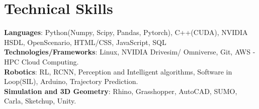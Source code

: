 \documentclass[letterpaper,11pt]{article}
\newcommand{\resumeSubHeadingListStart}{\begin{itemize}[leftmargin=0.0in, label={}]}
\newcommand{\resumeSubHeadingListEnd}{\end{itemize}}
\begin{document}


\section{Technical Skills}
 \begin{itemize}[leftmargin=0.15in, label={}]
    \small{\item{
     \textbf{Languages}{: Python(Numpy, Scipy, Pandas, Pytorch), C++(CUDA), NVIDIA HSDL, OpenScenario, HTML/CSS, JavaScript, SQL} \\
     \textbf{Technologies/Frameworks}{: Linux, NVIDIA Drivesim/ Omniverse, Git, AWS - HPC Cloud Computing.} \\
     \textbf{Robotics}{: RL, RCNN, Perception and Intelligent algorithms, Software in Loop(SIL), Arduino, Trajectory Prediction.} \\
     \textbf{Simulation and 3D Geometry}{: Rhino, Grasshopper, AutoCAD, SUMO, Carla, Sketchup, Unity.}
    }}
 \end{itemize}
 \vspace{-17pt}
\end{document}
